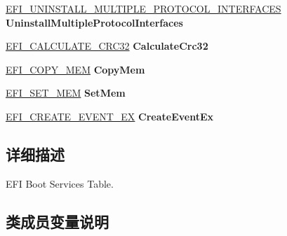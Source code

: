 \begin{DoxyCompactItemize}
\hyperlink{_uefi_spec_8h_a801d8cc0f369fdc80b361a0121fa8ce9}{E\+F\+I\+\_\+\+U\+N\+I\+N\+S\+T\+A\+L\+L\+\_\+\+M\+U\+L\+T\+I\+P\+L\+E\+\_\+\+P\+R\+O\+T\+O\+C\+O\+L\+\_\+\+I\+N\+T\+E\+R\+F\+A\+C\+ES} {\bfseries Uninstall\+Multiple\+Protocol\+Interfaces}
\item 
\mbox{\label{struct_e_f_i___b_o_o_t___s_e_r_v_i_c_e_s_abf2d095faca4416c51f6e391f4c7eb2b}} 
\hyperlink{_uefi_spec_8h_a2183b05b61adc1527900a3cf45718ef3}{E\+F\+I\+\_\+\+C\+A\+L\+C\+U\+L\+A\+T\+E\+\_\+\+C\+R\+C32} {\bfseries Calculate\+Crc32}
\item 
\mbox{\label{struct_e_f_i___b_o_o_t___s_e_r_v_i_c_e_s_a8cde1379cb88bb867b1d94b9d7ee864a}} 
\hyperlink{_uefi_spec_8h_a8c3afdd15369670fd896e805e866d4db}{E\+F\+I\+\_\+\+C\+O\+P\+Y\+\_\+\+M\+EM} {\bfseries Copy\+Mem}
\item 
\mbox{\label{struct_e_f_i___b_o_o_t___s_e_r_v_i_c_e_s_a1cdb642d7c79df6302c85b7640ba8f18}} 
\hyperlink{_uefi_spec_8h_aabb6ae3021aa8fd3fc0ade1cd51666ba}{E\+F\+I\+\_\+\+S\+E\+T\+\_\+\+M\+EM} {\bfseries Set\+Mem}
\item 
\mbox{\label{struct_e_f_i___b_o_o_t___s_e_r_v_i_c_e_s_ab4c1d9fad5b75bf0729c6798ffe4f9bd}} 
\hyperlink{_uefi_spec_8h_a78fd81bb75ad0d912af92ecae5ae968d}{E\+F\+I\+\_\+\+C\+R\+E\+A\+T\+E\+\_\+\+E\+V\+E\+N\+T\+\_\+\+EX} {\bfseries Create\+Event\+Ex}
\end{DoxyCompactItemize}


\subsection{详细描述}
E\+FI Boot Services Table. 

\subsection{类成员变量说明}
\mbox{\label{struct_e_f_i___b_o_o_t___s_e_r_v_i_c_e_s_a7a3c499784457ac6130feb038a9ddf5b}} 
